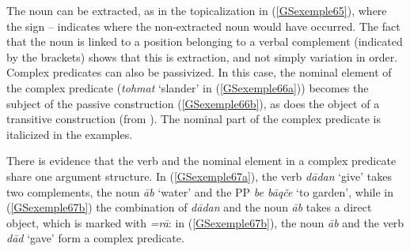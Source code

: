 \z
The noun can be extracted, as in the topicalization in (\ref{GSexemple65}), where the sign -- indicates where the non-extracted noun would have occurred. 
\z
The fact that the noun is linked to a position belonging to a verbal complement (indicated by the brackets) shows that this is extraction, and not simply variation in order.
Complex predicates can also be passivized. In this case, the nominal element of the complex predicate (\emph{tohmat} `slander' in (\ref{GSexemple66a})) becomes the subject of the passive construction (\ref{GSexemple66b}), as does the object of a transitive construction (from \citealt[251]{pollet2012grammaire}). The nominal part of the complex predicate is italicized in the examples.





\eal
	\label{GSexemple66} 
	\label{GSexemple66a}
		
    \label{GSexemple66b}
\zl

There is evidence that the verb and the nominal element in a complex predicate share one argument structure. In (\ref{GSexemple67a}), the verb \emph{d\=adan} `give' takes two complements, the noun \emph{\=ab} `water' and the PP \emph{be b\=aq\v ce} `to garden', while in (\ref{GSexemple67b}) the combination of \emph{d\=adan} and the noun \emph{\=ab} takes a direct object, which is marked with \emph{=r\=a}: in (\ref{GSexemple67b}), the noun \emph{\=ab} and the verb \emph{d\=ad} `gave' form a complex predicate.  

